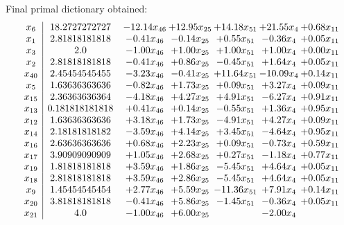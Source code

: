 \documentclass[8pt]{article}
\begin{document}
 Final primal dictionary obtained: 
\[\begin{array}{c| c c@{\hskip 2pt} c@{\hskip 2pt} c@{\hskip 2pt} c@{\hskip 2pt} c@{\hskip 2pt} }
 x_{6}   &  18.2727272727 & -12.14 x_{46} & + 12.95 x_{25} & + 14.18 x_{51} & + 21.55 x_{4} & +  0.68 x_{11}\\
 x_{1}   &  2.81818181818 & -0.41 x_{46} & -0.14 x_{25} & +  0.55 x_{51} & -0.36 x_{4} & +  0.05 x_{11}\\
 x_{3}   &  2.0 & -1.00 x_{46} & +  1.00 x_{25} & +  1.00 x_{51} & +  1.00 x_{4} & +  0.00 x_{11}\\
 x_{2}   &  2.81818181818 & -0.41 x_{46} & +  0.86 x_{25} & -0.45 x_{51} & +  1.64 x_{4} & +  0.05 x_{11}\\
 x_{40}   &  2.45454545455 & -3.23 x_{46} & -0.41 x_{25} & + 11.64 x_{51} & -10.09 x_{4} & +  0.14 x_{11}\\
 x_{5}   &  1.63636363636 & -0.82 x_{46} & +  1.73 x_{25} & +  0.09 x_{51} & +  3.27 x_{4} & +  0.09 x_{11}\\
 x_{15}   &  2.36363636364 & -4.18 x_{46} & +  4.27 x_{25} & +  4.91 x_{51} & -6.27 x_{4} & +  0.91 x_{11}\\
 x_{13}   &  0.181818181818 & +  0.41 x_{46} & +  0.14 x_{25} & -0.55 x_{51} & +  1.36 x_{4} & +  0.95 x_{11}\\
 x_{12}   &  1.63636363636 & +  3.18 x_{46} & +  1.73 x_{25} & -4.91 x_{51} & +  4.27 x_{4} & +  0.09 x_{11}\\
 x_{14}   &  2.18181818182 & -3.59 x_{46} & +  4.14 x_{25} & +  3.45 x_{51} & -4.64 x_{4} & +  0.95 x_{11}\\
 x_{16}   &  2.63636363636 & +  0.68 x_{46} & +  2.23 x_{25} & +  0.09 x_{51} & -0.73 x_{4} & +  0.59 x_{11}\\
 x_{17}   &  3.90909090909 & +  1.05 x_{46} & +  2.68 x_{25} & +  0.27 x_{51} & -1.18 x_{4} & +  0.77 x_{11}\\
 x_{19}   &  1.81818181818 & +  3.59 x_{46} & +  1.86 x_{25} & -5.45 x_{51} & +  4.64 x_{4} & +  0.05 x_{11}\\
 x_{18}   &  2.81818181818 & +  3.59 x_{46} & +  2.86 x_{25} & -5.45 x_{51} & +  4.64 x_{4} & +  0.05 x_{11}\\
 x_{9}   &  1.45454545454 & +  2.77 x_{46} & +  5.59 x_{25} & -11.36 x_{51} & +  7.91 x_{4} & +  0.14 x_{11}\\
 x_{20}   &  3.81818181818 & -0.41 x_{46} & +  5.86 x_{25} & -1.45 x_{51} & -0.36 x_{4} & +  0.05 x_{11}\\
 x_{21}   &  4.0 & -1.00 x_{46} & +  6.00 x_{25} &   & -2.00 x_{4} &   \\

\end{array}\]
\end{document}
